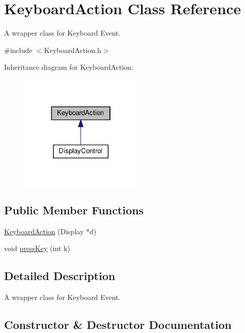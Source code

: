 \hypertarget{classKeyboardAction}{}\section{Keyboard\+Action Class Reference}
\label{classKeyboardAction}


A wrapper class for Keyboard Event.  




{\ttfamily \#include $<$Keyboard\+Action.\+h$>$}



Inheritance diagram for Keyboard\+Action\+:\nopagebreak
\begin{figure}[H]
\begin{center}
\leavevmode
\includegraphics[width=166pt]{classKeyboardAction__inherit__graph}
\end{center}
\end{figure}
\subsection*{Public Member Functions}
\begin{DoxyCompactItemize}
\item 
\hyperlink{classKeyboardAction_af59163694e9b55ceaa75d779363e7fc9}{Keyboard\+Action} (Display $\ast$d)
\item 
void \hyperlink{classKeyboardAction_ab09e3956685d6fb11cd1cdf86a673b48}{press\+Key} (int k)
\end{DoxyCompactItemize}


\subsection{Detailed Description}
A wrapper class for Keyboard Event. 

\subsection{Constructor \& Destructor Documentation}
\mbox{\label{classKeyboardAction_af59163694e9b55ceaa75d779363e7fc9}} 
